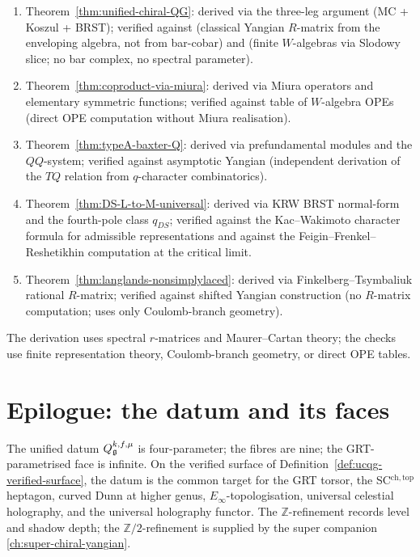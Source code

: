 \begin{enumerate}
\item Theorem~\ref{thm:unified-chiral-QG}: derived via the three-leg
 argument (MC + Koszul + BRST); verified against \cite{Drinfeld85}
 (classical Yangian $R$-matrix from the enveloping algebra, not from
 bar-cobar) and \cite{Premet02} (finite $W$-algebras via Slodowy
 slice; no bar complex, no spectral parameter).
\item Theorem~\ref{thm:coproduct-via-miura}: derived via Miura
 operators and elementary symmetric functions; verified against
 \cite{BouwknegtSchoutens93} table of $W$-algebra OPEs (direct OPE
 computation without Miura realisation).
\item Theorem~\ref{thm:typeA-baxter-Q}: derived via prefundamental
 modules and the $QQ$-system; verified against \cite{HernandezJimbo12}
 asymptotic Yangian (independent derivation of the $TQ$ relation from
 $q$-character combinatorics).
\item Theorem~\ref{thm:DS-L-to-M-universal}: derived via KRW BRST
 normal-form and the fourth-pole class $q_{DS}$; verified against the
 Kac--Wakimoto character formula for admissible representations and
 against the Feigin--Frenkel--Reshetikhin computation at the critical
 limit.
\item Theorem~\ref{thm:langlands-nonsimplylaced}: derived via
 Finkelberg--Tsymbaliuk rational $R$-matrix; verified against
 \cite{KamnitzerTappeWeekes14} shifted Yangian construction (no
 $R$-matrix computation; uses only Coulomb-branch geometry).
\end{enumerate}

The derivation uses spectral $r$-matrices and Maurer--Cartan theory;
the checks use finite representation theory, Coulomb-branch geometry,
or direct OPE tables.

\section*{Epilogue: the datum and its faces}

The unified datum $Q_{\mathfrak{g}}^{k,f,\mu}$ is four-parameter; the fibres
are nine; the GRT-parametrised face is infinite. On the verified
surface of Definition~\ref{def:ucqg-verified-surface}, the datum is
the common target for the GRT torsor, the SC$^{\mathrm{ch,top}}$
heptagon, curved Dunn at higher genus, $E_{\infty}$-topologisation,
universal celestial holography, and the universal holography functor.
The $\mathbb{Z}$-refinement records level and shadow depth; the
$\mathbb{Z}/2$-refinement is supplied by the super companion
\cref{ch:super-chiral-yangian}.

